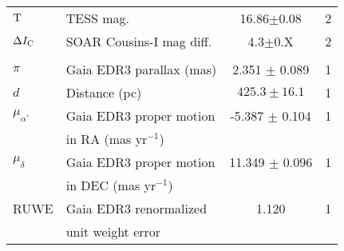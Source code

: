 \begin{table*}
\begin{tabular}{llcc}
${\rm T}$\dotfill     & TESS mag.\dotfill     & 16.86$\pm$0.08 & 2\\
$\Delta I_{\rm C}$\dotfill     & SOAR Cousins-I mag diff.\dotfill & 4.3$\pm$0.X & 2\\
\\
$\pi$\dotfill & Gaia EDR3 parallax (mas) \dotfill & 2.351 $\pm$ 0.089 &  1 \\
$d$\dotfill & Distance (pc)\dotfill & $425.3 \pm 16.1$ & 1 \\
$\mu_{\alpha'}$\dotfill		& Gaia EDR3 proper motion\dotfill & -5.387 $\pm$ 0.104 & 1 \\
                    & \hspace{3pt} in RA (mas yr$^{-1}$)	&  \\
$\mu_{\delta}$\dotfill		& Gaia EDR3 proper motion\dotfill 	&  11.349 $\pm$ 0.096 &  1 \\
                    & \hspace{3pt} in DEC (mas yr$^{-1}$) &  \\
RUWE\dotfill		& Gaia EDR3 renormalized\dotfill 	&  1.120 &  1 \\
                    & \hspace{3pt} unit weight error &  \\

\end{tabular}
\end{table*}
